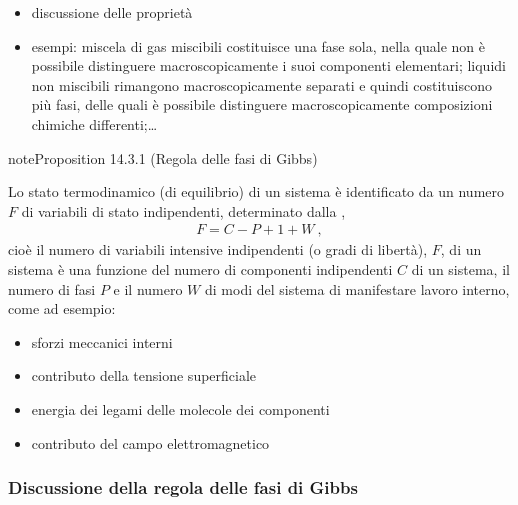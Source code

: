 \documentclass[letterpaper,10pt,italian]{jupyterBook}
\begin{document}
\sphinxAtStartPar
{}
\begin{itemize}
\item {} 
\sphinxAtStartPar
discussione delle proprietà

\item {} 
\sphinxAtStartPar
esempi: miscela di gas miscibili costituisce una fase sola, nella quale non è possibile distinguere macroscopicamente i suoi componenti elementari; liquidi non miscibili rimangono macroscopicamente separati e quindi costituiscono più fasi, delle quali è possibile distinguere macroscopicamente composizioni chimiche differenti;…

\end{itemize}
\label{ch/thermodynamics/principles-gibbs-phase-rule:proposition-4}
\begin{sphinxadmonition}{note}{Proposition 14.3.1 (Regola delle fasi di Gibbs)}



\sphinxAtStartPar
Lo stato termodinamico (di equilibrio) di un sistema è identificato da un numero \(F\) di variabili di stato  indipendenti, determinato dalla ,
\begin{equation*}
\begin{split}F = C - P + 1 + W \ ,\end{split}
\end{equation*}
\sphinxAtStartPar
cioè il numero di variabili intensive indipendenti (o gradi di libertà), \(F\), di un sistema è una funzione del numero di componenti indipendenti \(C\) di un sistema, il numero di fasi \(P\) e il numero \(W\) di modi del sistema di manifestare lavoro interno, come ad esempio:
\begin{itemize}
\item {} 
\sphinxAtStartPar
sforzi meccanici interni

\item {} 
\sphinxAtStartPar
contributo della tensione superficiale

\item {} 
\sphinxAtStartPar
energia dei legami delle molecole dei componenti

\item {} 
\sphinxAtStartPar
contributo del campo elettromagnetico

\end{itemize}
\end{sphinxadmonition}
\subsubsection*{Discussione della regola delle fasi di Gibbs}
\end{document}
